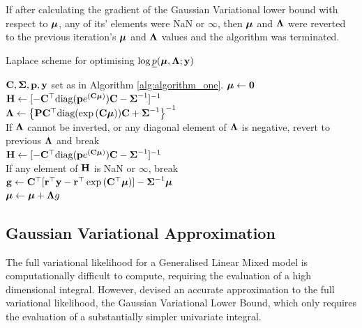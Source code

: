 If after calculating the gradient of the Gaussian Variational lower bound with
respect to ${\boldsymbol \mu}$, any of its' elements were NaN or $\infty$, then ${\boldsymbol \mu}$ and
${\boldsymbol \Lambda}$ were reverted to the previous iteration's ${\boldsymbol \mu}$ and ${\boldsymbol \Lambda}$
values and the algorithm was terminated.
		
\begin{algorithm}
	\caption{Laplace scheme for optimising $\log \underline{p}({\boldsymbol \mu}, {\boldsymbol \Lambda}; {\bf y})$}
	\label{alg:laplace_alg}
	\begin{algorithmic}
		\REQUIRE ${\bf C}, {\boldsymbol \Sigma}, {\bf p}, {\bf y}$ set as in Algorithm \ref{alg:algorithm_one}.
		\STATE ${\boldsymbol \mu} \leftarrow {\bf0}$ \\ [1ex]
		\STATE ${\bf H} \leftarrow [- {\bf C}^\top \text{diag}({\bf p} e^{({\bf C} {\boldsymbol \mu})}) {\bf C} - {\boldsymbol \Sigma}^{-1}]^{-1}$ \\ [1ex]
		\STATE ${\boldsymbol \Lambda} \leftarrow \left \{{\bf P} {\bf C}^\top \text{diag}(\exp{({\bf C}{\boldsymbol\mu})}) {\bf C} + {\boldsymbol \Sigma}^{-1} \right \}^{-1}$ \\ [1ex] 
		If ${\boldsymbol \Lambda}$ cannot be inverted, or any diagonal element of ${\boldsymbol \Lambda}$ is negative, revert to previous
		${\boldsymbol \Lambda}$ and break \\ [1ex]
		\STATE ${\bf H}
		\leftarrow [- {\bf C}^\top \text{diag}({\bf p} e^{({\bf C} {\boldsymbol \mu})}) {\bf C} - {\boldsymbol \Sigma}^{-1}]^{-1}$ \\ [1ex]
		If any element of ${\bf H}$ is NaN or $\infty$, break \\ [1ex]
		\STATE ${\bf g} \leftarrow {\bf C}^\top[{\bf r}^\top{\bf y} - {\bf r}^\top\exp{({\bf C}^\top{\boldsymbol\mu})}] - {\boldsymbol \Sigma}^{-1}{\boldsymbol \mu}$ \\ [1ex]
		\STATE ${\boldsymbol \mu} \leftarrow {\boldsymbol\mu} + {\boldsymbol \Lambda} g$ \\ [1ex]
		\ENDWHILE
	\end{algorithmic}
\end{algorithm}
		
\subsection{Gaussian Variational Approximation}
		
The full variational likelihood for a Generalised Linear Mixed model is
computationally difficult to compute, requiring the evaluation of a high
dimensional integral. However, \cite{Ormerod2012} devised an accurate
approximation to the full variational likelihood, the Gaussian Variational
Lower Bound, which only requires the evaluation of a substantially simpler
univariate integral.
	
